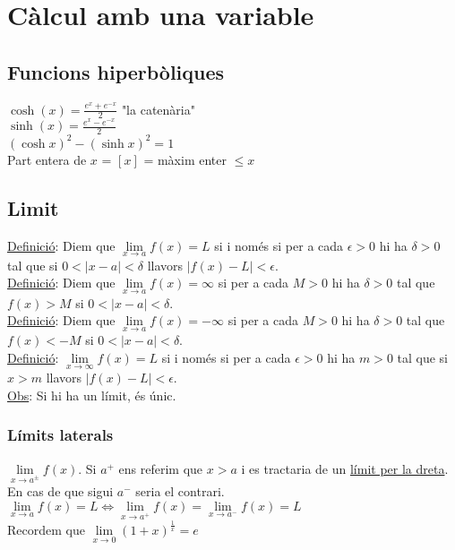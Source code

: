 \section{Càlcul amb una variable}
\newpage
{}
\subsection{Funcions hiperbòliques}
$\cosh(x) = \frac{e^x+e^{-x}}{2}$ "la catenària"\\
$\sinh(x) = \frac{e^x-e^{-x}}{2}$\\
$(\cosh x)^2 - (\sinh x)^2 = 1$\\
Part entera de $x$ = $[x]$ = màxim enter $\leq x$
\subsection{Limit}
\underline{Definició}: Diem que $\lim\limits_{x\rightarrow a}f(x) = L$ si i només si per a cada $\epsilon > 0$ hi ha $\delta > 0$ tal que si $0 < |x-a| < \delta$ llavors $|f(x)-L| < \epsilon$.\\
\underline{Definició}: Diem que $\lim\limits_{x\rightarrow a} f(x) = \infty$ si per a cada $M > 0$ hi ha $\delta > 0$ tal que $f(x)>M$ si $0<|x-a|<\delta$.\\
\underline{Definició}: Diem que $\lim\limits_{x\rightarrow a} f(x) = - \infty$ si per a cada $M > 0$ hi ha $\delta > 0$ tal que $f(x)<-M$ si $0<|x-a|<\delta$.\\
\underline{Definició}: $\lim\limits_{x\rightarrow \infty} f(x)=L$ si i només si per a cada $\epsilon>0$ hi ha $m>0$ tal que si $x>m$ llavors $|f(x)-L| < \epsilon$.\\
\underline{Obs}: Si hi ha un límit, és únic. 
\subsubsection{Límits laterals}
$\lim\limits_{x\rightarrow a^\pm} f(x)$. Si $a^+$ ens referim que $x > a$ i es tractaria de un \underline{límit per la dreta}. En cas de que sigui $a^-$ seria el contrari. \\
$\lim\limits_{x\rightarrow a} f(x) = L \Longleftrightarrow \lim\limits_{x\rightarrow a^+} f(x) = \lim\limits_{x\rightarrow a^-} f(x) = L$\\
Recordem que $\lim\limits_{x\rightarrow 0} (1+x)^\frac{1}{x} = e$\\
